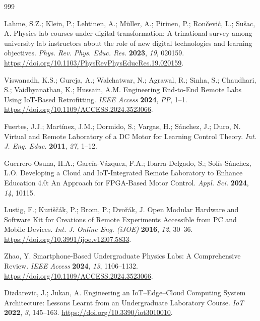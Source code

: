 \documentclass[journal,article,submit,pdftex]{Definitions/mdpi}
\begin{document}

\begin{thebibliography}{999}

Lahme, S.Z.; Klein, P.; Lehtinen, A.; M\"uller, A.; Pirinen, P.; Ron\v{c}evi\'c, L.; Su\v{s}ac, A.
Physics lab courses under digital transformation: A trinational survey among university lab instructors about the role of new digital technologies and learning objectives.
\textit{Phys. Rev. Phys. Educ. Res.} \textbf{2023}, \textit{19}, 020159.
\href{https://doi.org/10.1103/PhysRevPhysEducRes.19.020159}{https://doi.org/10.1103/PhysRevPhysEducRes.19.020159}.

Viswanadh, K.S.; Gureja, A.; Walchatwar, N.; Agrawal, R.; Sinha, S.; Chaudhari, S.; Vaidhyanathan, K.; Hussain, A.M.
Engineering End-to-End Remote Labs Using IoT-Based Retrofitting.
\textit{IEEE Access} \textbf{2024}, \textit{PP}, 1--1.
\href{https://doi.org/10.1109/ACCESS.2024.3523066}{https://doi.org/10.1109/ACCESS.2024.3523066}.

Fuertes, J.J.; Mart\'inez, J.M.; Dormido, S.; Vargas, H.; S\'anchez, J.; Duro, N.
Virtual and Remote Laboratory of a DC Motor for Learning Control Theory.
\textit{Int. J. Eng. Educ.} \textbf{2011}, \textit{27}, 1--12.

Guerrero-Osuna, H.A.; Garc\'ia-V\'azquez, F.A.; Ibarra-Delgado, S.; Sol\'is-S\'anchez, L.O.
Developing a Cloud and IoT-Integrated Remote Laboratory to Enhance Education 4.0: An Approach for FPGA-Based Motor Control.
\textit{Appl. Sci.} \textbf{2024}, \textit{14}, 10115.

Lustig, F.; Kuri\v{s}\v{c}\'ak, P.; Brom, P.; Dvo\v{r}\'ak, J.
Open Modular Hardware and Software Kit for Creations of Remote Experiments Accessible from PC and Mobile Devices.
\textit{Int. J. Online Eng. (iJOE)} \textbf{2016}, \textit{12}, 30--36.
\href{https://doi.org/10.3991/ijoe.v12i07.5833}{https://doi.org/10.3991/ijoe.v12i07.5833}.

Zhao, Y.
Smartphone-Based Undergraduate Physics Labs: A Comprehensive Review.
\textit{IEEE Access} \textbf{2024}, \textit{13}, 1106--1132.
\href{https://doi.org/10.1109/ACCESS.2024.3523066}{https://doi.org/10.1109/ACCESS.2024.3523066}.

Dizdarevic, J.; Jukan, A.
Engineering an IoT--Edge--Cloud Computing System Architecture: Lessons Learnt from an Undergraduate Laboratory Course.
\textit{IoT} \textbf{2022}, \textit{3}, 145--163.
\href{https://doi.org/10.3390/iot3010010}{https://doi.org/10.3390/iot3010010}.


\end{thebibliography}
\end{document}
